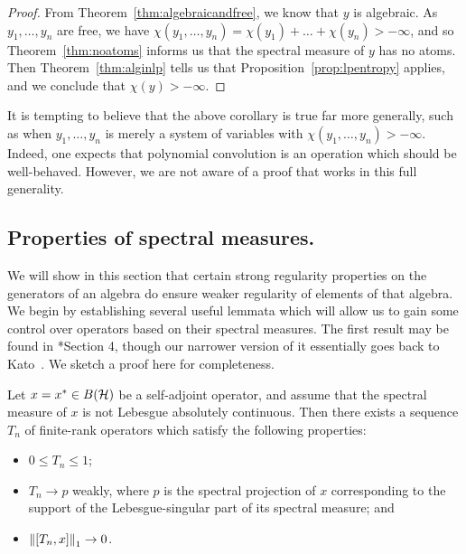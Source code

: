 \begin{proof}
	From Theorem~\ref{thm:algebraicandfree}, we know that $y$ is algebraic.
	As $y_1, \ldots, y_n$ are free, we have $\chi(y_1, \ldots, y_n) = \chi(y_1) + \ldots + \chi(y_n) > -\infty$, and so Theorem~\ref{thm:noatoms} informs us that the spectral measure of $y$ has no atoms.
	Then Theorem~\ref{thm:alginlp} tells us that Proposition~\ref{prop:lpentropy} applies, and we conclude that $\chi(y) > -\infty$.
\end{proof}

It is tempting to believe that the above corollary is true far more generally, such as when $y_1, \ldots, y_n$ is merely a system of variables with $\chi(y_1, \ldots, y_n) > -\infty$.
Indeed, one expects that polynomial convolution is an operation which should be well-behaved.
However, we are not aware of a proof that works in this full generality.


\subsection{Properties of spectral measures.}
We will show in this section that certain strong regularity properties on the generators of an algebra do ensure weaker regularity of elements of that algebra.
We begin by establishing several useful lemmata which will allow us to gain some control over operators based on their spectral measures.
The first result may be found in \cite{voiculescu1979some}*{Section 4}, though our narrower version of it essentially goes back to Kato~\cite{kato1966perturbation}.
We sketch a proof here for completeness.
\begin{lemma}
	\label{lem:singularcontractioncommutation}
	Let $x = x^* \in B(\mathcal{H})$ be a self-adjoint operator, and assume that the spectral measure of $x$ is not Lebesgue absolutely continuous.
	Then there exists a sequence $T_n$ of finite-rank operators which satisfy the following properties:
	\begin{itemize}
		\item $0 \leq T_n \leq 1$;
		\item $T_n \to p$ weakly, where $p$ is the spectral projection of $x$ corresponding to the support of the Lebesgue-singular part of its spectral measure; and
		\item $\left\|[T_n, x]\right\|_1 \to 0$.
	\end{itemize}
\end{lemma}


